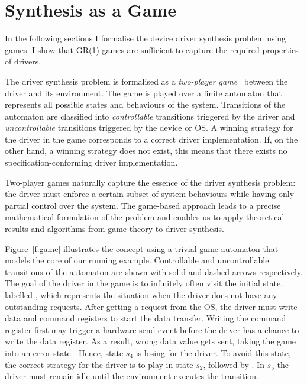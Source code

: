 \chapter{Synthesis as a Game}

In the following sections I formalise the device driver synthesis problem using games. I show that GR(1) games are sufficient to capture the required properties of drivers.

The driver synthesis problem is formalised as a \emph{two-player game}~\cite{Thomas_95} between the driver and its environment. The game is played over a finite automaton that represents all possible states and behaviours of the system. Transitions of the automaton are classified into \emph{controllable} transitions triggered by the driver and \emph{uncontrollable} transitions triggered by the device or OS. A winning strategy for the driver in the game corresponds to a correct driver implementation. If, on the other hand, a winning strategy does not exist, this means that there exists no specification-conforming driver implementation.

Two-player games naturally capture the essence of the driver synthesis problem: the driver must enforce a certain subset of system behaviours while having only partial control over the system. The game-based approach leads to a precise mathematical formulation of the problem and enables us to apply theoretical results and algorithms from game theory to driver synthesis.

Figure~\ref{f:game} illustrates the concept using a trivial game automaton that models the core of our running example. Controllable and uncontrollable transitions of the automaton are shown with solid and dashed arrows respectively.  The goal of the driver in the game is to infinitely often visit the initial state, labelled , which represents the situation when the driver does not have any outstanding requests.  After getting a  request from the OS, the driver must write data and command registers to start the data transfer.  Writing the command register first may trigger a hardware send event before the driver has a chance to write the data register.  As a result, wrong data value gets sent, taking the game into an error state .  Hence, state $s_4$ is losing for the driver.  To avoid this state, the correct strategy for the driver is to play  in state $s_2$, followed by .  In $s_5$ the driver must remain idle until the environment executes the  transition.

